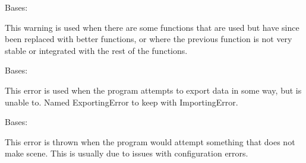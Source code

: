 \documentclass[letterpaper,10pt,english]{sphinxmanual}
\begin{document}

\begin{fulllineitems}
\label{\detokenize{python_docstrings/IfA_Smeargle.meta.errors:IfA_Smeargle.meta.errors.DepreciationWarning}}
Bases: {\hyperref[\detokenize{python_docstrings/IfA_Smeargle.meta.errors:IfA_Smeargle.meta.errors.Smeargle_Warning}]{}}

This warning is used when there are some functions that are used but
have since been replaced with better functions, or where the previous
function is not very stable or integrated with the rest of the functions.

\end{fulllineitems}


\begin{fulllineitems}
\label{\detokenize{python_docstrings/IfA_Smeargle.meta.errors:IfA_Smeargle.meta.errors.ExportingError}}
Bases: {\hyperref[\detokenize{python_docstrings/IfA_Smeargle.meta.errors:IfA_Smeargle.meta.errors.Smeargle_Exception}]{}}

This error is used when the program attempts to export data in some way,
but is unable to. Named ExportingError to keep with ImportingError.

\end{fulllineitems}


\begin{fulllineitems}
\label{\detokenize{python_docstrings/IfA_Smeargle.meta.errors:IfA_Smeargle.meta.errors.IllogicalProsedureError}}
Bases: {\hyperref[\detokenize{python_docstrings/IfA_Smeargle.meta.errors:IfA_Smeargle.meta.errors.Smeargle_Exception}]{}}

This error is thrown when the program would attempt something that does
not make scene. This is usually due to issues with configuration errors.

\end{fulllineitems}
\end{document}
